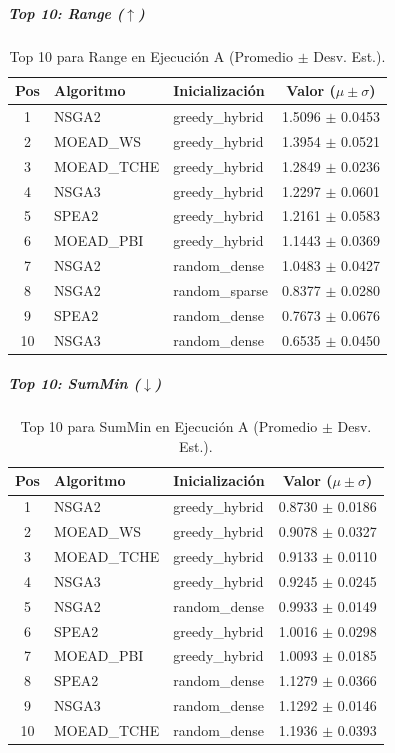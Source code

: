 \subparagraph{Top 10: Range ($\uparrow$)}
\begin{table}[H]
    \centering
    \begin{tabular}{cllc}
        \toprule
        Pos & Algoritmo & Inicialización & Valor ($\mu \pm \sigma$) \\
        \midrule
        1 & NSGA2 & greedy\_hybrid & 1.5096 $\pm$ 0.0453 \\
        2 & MOEAD\_WS & greedy\_hybrid & 1.3954 $\pm$ 0.0521 \\
        3 & MOEAD\_TCHE & greedy\_hybrid & 1.2849 $\pm$ 0.0236 \\
        4 & NSGA3 & greedy\_hybrid & 1.2297 $\pm$ 0.0601 \\
        5 & SPEA2 & greedy\_hybrid & 1.2161 $\pm$ 0.0583 \\
        6 & MOEAD\_PBI & greedy\_hybrid & 1.1443 $\pm$ 0.0369 \\
        7 & NSGA2 & random\_dense & 1.0483 $\pm$ 0.0427 \\
        8 & NSGA2 & random\_sparse & 0.8377 $\pm$ 0.0280 \\
        9 & SPEA2 & random\_dense & 0.7673 $\pm$ 0.0676 \\
        10 & NSGA3 & random\_dense & 0.6535 $\pm$ 0.0450 \\
        \bottomrule
    \end{tabular}
    \caption{Top 10 para Range en Ejecución A (Promedio $\pm$ Desv. Est.).}
\end{table}

\subparagraph{Top 10: SumMin ($\downarrow$)}
\begin{table}[H]
    \centering
    \begin{tabular}{cllc}
        \toprule
        Pos & Algoritmo & Inicialización & Valor ($\mu \pm \sigma$) \\
        \midrule
        1 & NSGA2 & greedy\_hybrid & 0.8730 $\pm$ 0.0186 \\
        2 & MOEAD\_WS & greedy\_hybrid & 0.9078 $\pm$ 0.0327 \\
        3 & MOEAD\_TCHE & greedy\_hybrid & 0.9133 $\pm$ 0.0110 \\
        4 & NSGA3 & greedy\_hybrid & 0.9245 $\pm$ 0.0245 \\
        5 & NSGA2 & random\_dense & 0.9933 $\pm$ 0.0149 \\
        6 & SPEA2 & greedy\_hybrid & 1.0016 $\pm$ 0.0298 \\
        7 & MOEAD\_PBI & greedy\_hybrid & 1.0093 $\pm$ 0.0185 \\
        8 & SPEA2 & random\_dense & 1.1279 $\pm$ 0.0366 \\
        9 & NSGA3 & random\_dense & 1.1292 $\pm$ 0.0146 \\
        10 & MOEAD\_TCHE & random\_dense & 1.1936 $\pm$ 0.0393 \\
        \bottomrule
    \end{tabular}
    \caption{Top 10 para SumMin en Ejecución A (Promedio $\pm$ Desv. Est.).}
\end{table}

